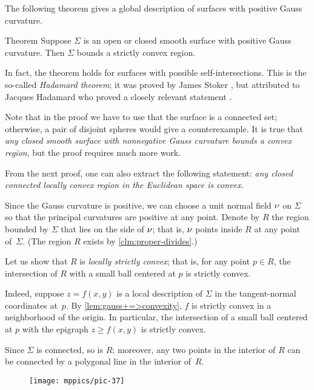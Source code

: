 The following theorem gives a global description of surfaces with positive Gauss curvature.

\begin{thm}{Theorem}\label{thm:convex-embedded}
Suppose $\Sigma$ is an open or closed smooth surface with positive Gauss curvature.
Then $\Sigma$ bounds a strictly convex region.
\end{thm}

In fact, the theorem holds for surfaces with possible self-intersections. 
This is the so-called {}\emph{Hadamard theorem};
it was proved by James Stoker \cite{stoker}, but attributed to Jacques Hadamard who proved a closely relevant statement \cite[item 23]{hadamard}.

Note that in the proof we have to use that the surface is a connected set;
otherwise, a pair of disjoint spheres would give a counterexample.
It is true that \textit{any closed smooth surface with nonnegative Gauss curvature bounds a convex region}, but the proof requires much more work.

From the next proof, one can also extract the following statement: \textit{any closed connected locally convex region in the Euclidean space is convex}.

Since the Gauss curvature is positive, we can choose a unit normal field $\nu$ on $\Sigma$ so that the principal curvatures are positive at any point.
Denote by $R$ the region bounded by $\Sigma$ that lies on the side of $\nu$;
that is, $\nu$ points inside $R$ at any point of~$\Sigma$.
(The region $R$ exists by \ref{clm:proper-divides}.)

Let us show that $R$ is {}\emph{locally strictly convex};
that is, for any point $p\in R$, the intersection of $R$ with a small ball centered at $p$ is strictly convex.

Indeed, suppose $z=f(x,y)$ is a local description of $\Sigma$ in the tangent-normal coordinates at~$p$.
By \ref{lem:gauss+=>convexity}, $f$ is strictly convex in a neighborhood of the origin.
In particular, the intersection of a small ball centered at $p$ with the epigraph $z\ge f(x,y)$ is strictly convex.

Since $\Sigma$ is connected, so is $R$;
moreover, any two points in the interior of $R$ can be connected by a polygonal line in the interior of~$R$.

\begin{wrapfigure}{o}{43 mm}
\vskip-0mm
\centering
\texttt{[image: mppics/pic-37]}
\vskip-0mm
\end{wrapfigure}

